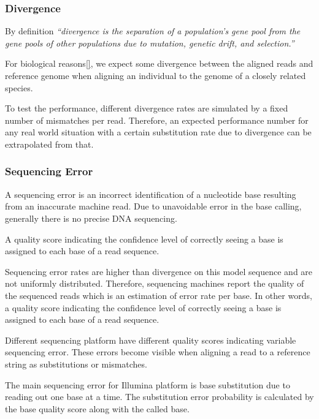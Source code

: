 \documentclass[11pt,a4paper]{report}
\newcommand{\quotes}[1]{``#1''}
\begin{document}

\subsubsection{Divergence} \label{Divergence}

By definition \emph{\quotes{divergence is the separation
of a population's gene pool from the gene pools of other populations 
due to mutation, genetic drift, and selection\cite{divergence1}.}}

For biological reasons\ref{}, we expect some divergence between
the aligned reads and reference genome when aligning an individual 
to the genome of a closely related species.

To test the performance, different divergence rates are simulated by 
a fixed number of mismatches per read. Therefore, an expected performance 
number for any real world situation with a certain substitution rate due to 
divergence can be extrapolated from that.
 
 

\subsubsection{Sequencing Error} \label{Sequencing Error}
 

A sequencing error is an incorrect identification of a nucleotide base resulting 
from an inaccurate machine read. Due to unavoidable error in the base calling, generally 
there is no precise DNA sequencing. 

A quality score indicating the confidence level of correctly seeing a base is 
assigned to each base of a read sequence.

Sequencing error rates are higher than divergence 
on this model sequence and are not uniformly distributed.
Therefore, sequencing machines report the quality 
of the sequenced reads which is an estimation of
error rate per base. In other words, a quality score 
indicating the confidence level of correctly 
seeing a base is assigned to each base of a read sequence.

Different sequencing platform have different quality scores indicating variable 
sequencing error. These errors become visible when aligning a read to a reference 
string as substitutions or mismatches.

The main sequencing error for Illumina platform is base substitution due to 
reading out one base at a time\cite{art}. The substitution error probability is 
calculated by the base quality score along with the called base.\\
\end{document}
